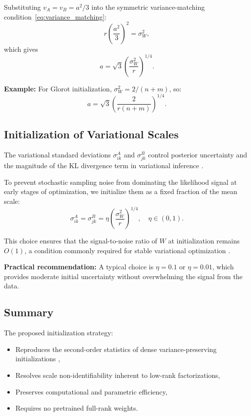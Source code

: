 \documentclass{article}
\theoremstyle{plain}
\theoremstyle{definition}
\theoremstyle{remark}
\begin{document}
Substituting $v_A = v_B = a^2/3$ into the symmetric variance-matching condition~\eqref{eq:variance_matching}:
\[
r \left(\frac{a^2}{3}\right)^2 = \sigma_W^2,
\]
which gives
\[
a = \sqrt{3}\left(\frac{\sigma_W^2}{r}\right)^{1/4}.
\]

\textbf{Example:} For Glorot initialization, $\sigma_W^2 = 2/(n+m)$, so:
\[
a = \sqrt{3}\left(\frac{2}{r(n+m)}\right)^{1/4}.
\]

\subsection{Initialization of Variational Scales}\label{app:init:scales}

The variational standard deviations $\sigma^A_{ik}$ and $\sigma^B_{jk}$ control posterior uncertainty and the magnitude of the KL divergence term in variational inference \cite{blundell2015weight}.

To prevent stochastic sampling noise from dominating the likelihood signal at early stages of optimization, we initialize them as a fixed fraction of the mean scale:
\[
\sigma^A_{ik} = \sigma^B_{jk}
= \eta \left(\frac{\sigma_W^2}{r}\right)^{1/4},
\quad
\eta \in (0,1).
\]

This choice ensures that the signal-to-noise ratio of $W$ at initialization remains $O(1)$, a condition commonly required for stable variational optimization \cite{graves2011practical}.

\textbf{Practical recommendation:} A typical choice is $\eta = 0.1$ or $\eta = 0.01$, which provides moderate initial uncertainty without overwhelming the signal from the data.

\subsection{Summary}\label{app:init:summary}

The proposed initialization strategy:
\begin{itemize}
    \item Reproduces the second-order statistics of dense variance-preserving initializations \cite{pmlr-v9-glorot10a,he2015delving},
    \item Resolves scale non-identifiability inherent to low-rank factorizations,
    \item Preserves computational and parametric efficiency,
    \item Requires no pretrained full-rank weights.
\end{itemize}
\end{document}
